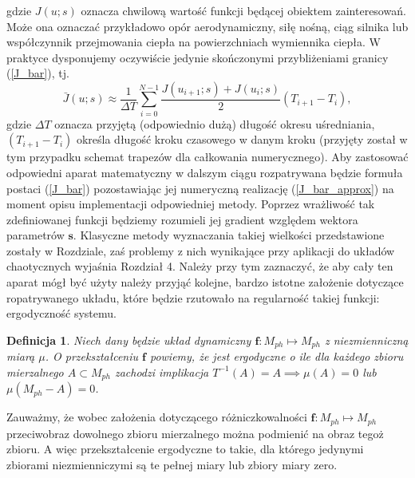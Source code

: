 \documentclass[12pt]{article}
\newtheorem{defi}{Definicja}
\begin{document}
gdzie $ J(u;s) $ oznacza chwilową wartość funkcji będącej obiektem zainteresowań. Może ona oznaczać przykładowo opór aerodynamiczny, siłę nośną, ciąg silnika lub współczynnik przejmowania ciepła na powierzchniach wymiennika ciepła. W praktyce dysponujemy oczywiście jedynie skończonymi przybliżeniami granicy (\ref{J_bar}), tj.
\begin{equation}
\bar{J}(u;s) \approx \frac{1}{\Delta T}\sum_{i=0}^{N-1}\frac{J(u_{i+1};s)+J(u_{i};s)}{2}(T_{i+1}-T_{i}),
\label{J_bar_approx}
\end{equation}
gdzie $ \Delta T $ oznacza przyjętą (odpowiednio dużą) długość okresu uśredniania,  $ (T_{i+1}-T_{i}) $ określa długość kroku czasowego w danym kroku (przyjęty został w tym przypadku schemat trapezów dla całkowania numerycznego).\newline
Aby zastosować odpowiedni aparat matematyczny w dalszym ciągu rozpatrywana będzie formuła postaci (\ref{J_bar}) pozostawiając jej numeryczną realizację (\ref{J_bar_approx}) na moment opisu implementacji odpowiedniej metody. Poprzez wrażliwość tak zdefiniowanej funkcji będziemy rozumieli jej gradient względem wektora parametrów $ \textbf{s} $. Klasyczne metody wyznaczania takiej wielkości przedstawione zostały w Rozdziale, zaś problemy z nich wynikające przy aplikacji do układów chaotycznych wyjaśnia Rozdział 4. Należy przy tym zaznaczyć, że aby cały ten aparat mógł być użyty należy przyjąć kolejne, bardzo istotne założenie dotyczące ropatrywanego układu, które będzie rzutowało na regularność takiej funkcji: ergodyczność systemu.
\begin{defi}\label{ergodicity}
Niech dany będzie układ dynamiczny $  \textbf{f}: M_{ph} \mapsto M_{ph}$ z niezmienniczną miarą $\mu$. O przekształceniu $  \textbf{f}$ powiemy, że jest ergodyczne o ile dla każdego zbioru mierzalnego $ A \subset M_{ph} $ zachodzi implikacja 
$ T^{-1}(A) = A  \implies \mu(A)=0$ lub $\mu(M_{ph}-A)=0$.
\end{defi} 
Zauważmy, że wobec założenia dotyczącego różniczkowalności $  \textbf{f}: M_{ph} \mapsto M_{ph}$ przeciwobraz dowolnego zbioru mierzalnego można podmienić na obraz tegoż zbioru. A więc przekształcenie ergodyczne to takie, dla którego jedynymi zbiorami niezmienniczymi są te pełnej miary lub zbiory miary zero. \newline
\end{document}
